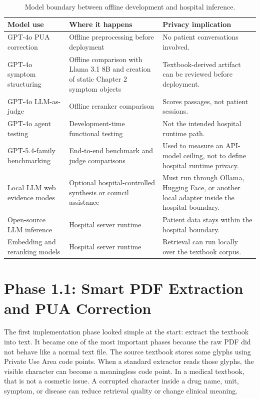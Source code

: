 \begin{table}[htbp]
\centering
\caption{Model boundary between offline development and hospital inference.}
\label{tab:model_boundary}
\begin{tabular}{p{} p{} p{}}
\toprule
\textbf{Model use} & \textbf{Where it happens} & \textbf{Privacy implication}\\
\midrule
GPT-4o PUA correction & Offline preprocessing before deployment & No patient conversations involved.\\
GPT-4o symptom structuring & Offline comparison with Llama 3.1 8B and creation of static Chapter 2 symptom objects & Textbook-derived artifact can be reviewed before deployment.\\
GPT-4o LLM-as-judge & Offline reranker comparison & Scores passages, not patient sessions.\\
GPT-4o agent testing & Development-time functional testing & Not the intended hospital runtime path.\\
GPT-5.4-family benchmarking & End-to-end benchmark and judge comparisons & Used to measure an API-model ceiling, not to define hospital runtime privacy.\\
Local LLM web evidence modes & Optional hospital-controlled synthesis or council assistance & Must run through Ollama, Hugging Face, or another local adapter inside the hospital boundary.\\
Open-source LLM inference & Hospital server runtime & Patient data stays within the hospital boundary.\\
Embedding and reranking models & Hospital server runtime & Retrieval can run locally over the textbook corpus.\\
\bottomrule
\end{tabular}
\end{table}

\section{Phase 1.1: Smart PDF Extraction and PUA Correction}

The first implementation phase looked simple at the start: extract the textbook into text. It became one of the most important phases because the raw PDF did not behave like a normal text file. The source textbook stores some glyphs using Private Use Area code points. When a standard extractor reads those glyphs, the visible character can become a meaningless code point. In a medical textbook, that is not a cosmetic issue. A corrupted character inside a drug name, unit, symptom, or disease can reduce retrieval quality or change clinical meaning.


